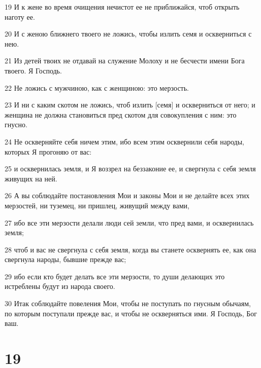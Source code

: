 \par 19 И к жене во время очищения нечистот ее не приближайся, чтоб открыть наготу ее.
\par 20 И с женою ближнего твоего не ложись, чтобы излить семя и оскверниться с нею.
\par 21 Из детей твоих не отдавай на служение Молоху и не бесчести имени Бога твоего. Я Господь.
\par 22 Не ложись с мужчиною, как с женщиною: это мерзость.
\par 23 И ни с каким скотом не ложись, чтоб излить [семя] и оскверниться от него; и женщина не должна становиться пред скотом для совокупления с ним: это гнусно.
\par 24 Не оскверняйте себя ничем этим, ибо всем этим осквернили себя народы, которых Я прогоняю от вас:
\par 25 и осквернилась земля, и Я воззрел на беззаконие ее, и свергнула с себя земля живущих на ней.
\par 26 А вы соблюдайте постановления Мои и законы Мои и не делайте всех этих мерзостей, ни туземец, ни пришлец, живущий между вами,
\par 27 ибо все эти мерзости делали люди сей земли, что пред вами, и осквернилась земля;
\par 28 чтоб и вас не свергнула с себя земля, когда вы станете осквернять ее, как она свергнула народы, бывшие прежде вас;
\par 29 ибо если кто будет делать все эти мерзости, то души делающих это истреблены будут из народа своего.
\par 30 Итак соблюдайте повеления Мои, чтобы не поступать по гнусным обычаям, по которым поступали прежде вас, и чтобы не оскверняться ими. Я Господь, Бог ваш.

\chapter{19}

